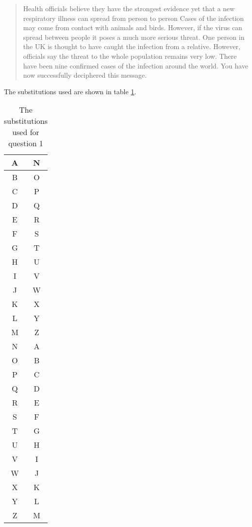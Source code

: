 \begin{quote}
Health officials believe they have the strongest evidence yet that a new respiratory illness can spread from person to person Cases of the infection may come from contact with animals and birds. However, if the virus can spread between people it poses a much more serious threat. One person in the UK is thought to have caught the infection from a relative. However, officials say the threat to the whole population remains very low. There have been nine confirmed cases of the infection around the world. You have now successfully deciphered this message.
\end{quote}

The substitutions used are shown in table \ref{tab:sub1}.

\begin{table}[h]
	\centering
	\begin{tabular}[h]{| c | c |}
		\hline
		A	& N	\\ \hline
		B	& O	\\ \hline
		C	& P	\\ \hline
		D	& Q	\\ \hline
		E	& R	\\ \hline
		F	& S	\\ \hline
		G	& T	\\ \hline
		H	& U	\\ \hline
		I	& V	\\ \hline
		J	& W	\\ \hline
		K	& X	\\ \hline
		L	& Y	\\ \hline
		M	& Z	\\ \hline
		N	& A	\\ \hline
		O	& B	\\ \hline
		P	& C	\\ \hline
		Q	& D	\\ \hline
		R	& E	\\ \hline
		S	& F	\\ \hline
		T	& G	\\ \hline
		U	& H	\\ \hline
		V	& I	\\ \hline
		W	& J	\\ \hline
		X	& K	\\ \hline
		Y	& L	\\ \hline
		Z	& M	\\ \hline
	\end{tabular}
	\caption{The substitutions used for question 1}
	\label{tab:sub1}
\end{table}
